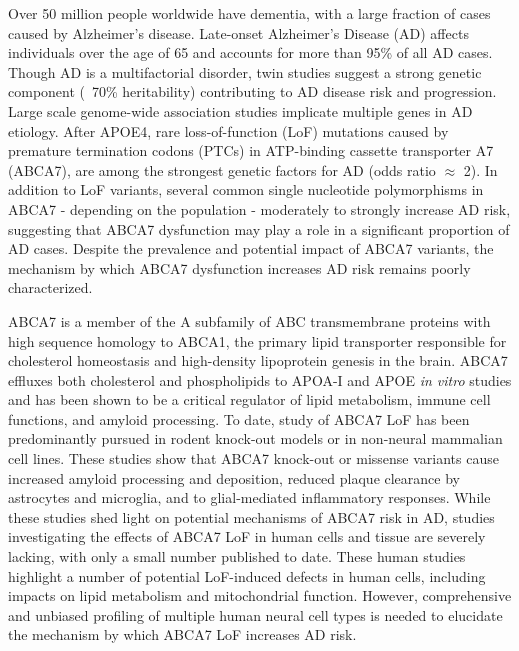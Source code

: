 Over 50 million people worldwide have dementia, with a large fraction of cases caused by Alzheimer’s disease\cite{WHO2023Dementia}. Late-onset Alzheimer’s Disease (AD) affects individuals over the age of 65 and accounts for more than 95\% of all AD cases\cite{Alzheimers_Association2016-jx}. Though AD is a multifactorial disorder, twin studies suggest a strong genetic component (~70\% heritability)\cite{Karlsson2022-vv} contributing to AD disease risk and progression. Large scale genome-wide association studies implicate multiple genes in AD etiology\cite{Lambert2013-km,Marioni2019-os,Jansen2019-ww,Kunkle2019-yo,Wightman2021-km,Bellenguez2022-ao,Belloy2023-kj}. After APOE4, rare loss-of-function (LoF) mutations caused by premature termination codons (PTCs) in ATP-binding cassette transporter A7 (ABCA7), are among the strongest genetic factors for AD (odds ratio $\approx$ 2)\cite{Steinberg2015-mu,De_Roeck2019-bs,Reitz2013-eo,Bellenguez2022-ao,Holstege2022-vp,Lyssenko2021-gw}. In addition to LoF variants, several common single nucleotide polymorphisms in ABCA7 - depending on the population - moderately\cite{Steinberg2015-mu,De_Roeck2019-bs,Reitz2013-eo,Bellenguez2022-ao,Le_Guennec2016-mr,Hollingworth2011-tr,Naj2011-bs} to strongly\cite{Reitz2013-eo} increase AD risk, suggesting that ABCA7 dysfunction may play a role in a significant proportion of AD cases. Despite the prevalence and potential impact of ABCA7 variants, the mechanism by which ABCA7 dysfunction increases AD risk remains poorly characterized. 

ABCA7 is a member of the A subfamily of ABC transmembrane proteins\cite{Kim2008-zi} with high sequence homology to ABCA1, the primary lipid transporter responsible for cholesterol homeostasis and high-density lipoprotein genesis in the brain\cite{Koldamova2014-kd}. ABCA7 effluxes both cholesterol and phospholipids to APOA-I and APOE \textit{in vitro} studies\cite{Abe-Dohmae2004-wb,Wang2003-wh,Tomioka2017-nv,Picataggi2022-yp,Quazi2013-pe,Fang2025} and has been shown to be a critical regulator of lipid metabolism, immune cell functions, and amyloid processing\cite{Aikawa2018-ek,Tanaka2011-zo,Duchateau2023-ji,Kawatani2023-vf,Tayran2024-bo}. To date, study of ABCA7 LoF has been predominantly pursued in rodent knock-out models or in non-neural mammalian cell lines. These studies show that ABCA7 knock-out or missense variants  cause increased amyloid processing and deposition\cite{Satoh2015-yu,Sakae2016-uy,Chan2008-qu,Bamji-Mirza2018-xt}, reduced plaque clearance by astrocytes and microglia\cite{Kim2013-sv,Fu2016-qe}, and to glial-mediated inflammatory responses\cite{Aikawa2019-hv,Aikawa2021-vz}.  While these studies shed light on potential mechanisms of ABCA7 risk in AD, studies investigating the effects of ABCA7 LoF in human cells and tissue are severely lacking, with only a small number published to date\cite{Kawatani2023-vf,Allen2017-vw,Liu2021-zh,Bamji-Mirza2018-xt}.  These human studies highlight a number of potential LoF-induced defects in human cells, including impacts on lipid metabolism and mitochondrial function\cite{Kawatani2023-vf}. However, comprehensive and unbiased profiling of multiple human neural cell types is needed to elucidate the mechanism by which ABCA7 LoF increases AD risk.

